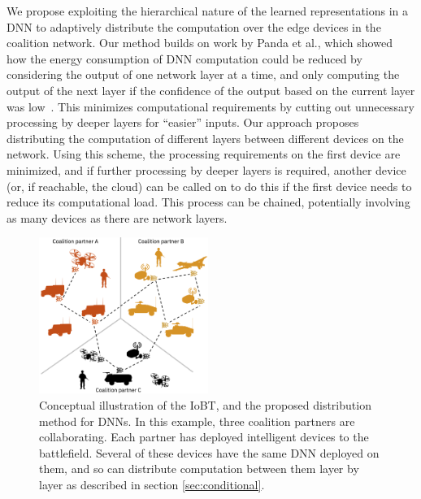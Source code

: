 We propose exploiting the hierarchical nature of the learned representations in a DNN to adaptively distribute the computation over the edge devices in the coalition network. Our method builds on work by Panda et al., which showed how the energy consumption of DNN computation could be reduced by considering the output of one network layer at a time, and only computing the output of the next layer if the confidence of the output based on the current layer was low~\cite{panda2016conditional, panda2017energy}. This minimizes computational requirements by cutting out unnecessary processing by deeper layers for ``easier'' inputs. Our approach proposes distributing the computation of different layers between different devices on the network. Using this scheme, the processing requirements on the first device are minimized, and if further processing by deeper layers is required, another device (or, if reachable, the cloud) can be called on to do this if the first device needs to reduce its computational load. This process can be chained, potentially involving as many devices as there are network layers.

\begin{figure}[ht]
\centering
\includegraphics[width=0.49\textwidth]{fig1.png}
\caption{Conceptual illustration of the IoBT, and the proposed distribution method for DNNs. In this example, three coalition partners are collaborating. Each partner has deployed intelligent devices to the battlefield. Several of these devices have the same DNN deployed on them, and so can distribute computation between them layer by layer as described in section \ref{sec:conditional}.}
\label{fig:coalition}
\end{figure}